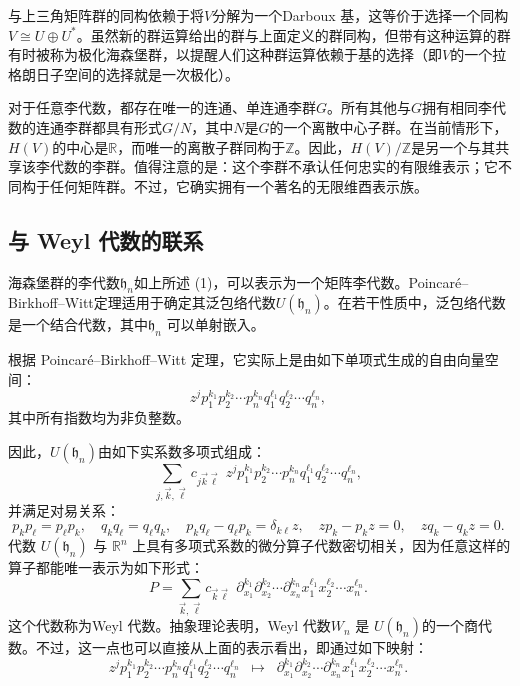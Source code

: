与上三角矩阵群的同构依赖于将$V$分解为一个Darboux 基，这等价于选择一个同构$V \cong U \oplus U^{*}$。虽然新的群运算给出的群与上面定义的群同构，但带有这种运算的群有时被称为极化海森堡群，以提醒人们这种群运算依赖于基的选择（即$V$的一个拉格朗日子空间的选择就是一次极化）。

对于任意李代数，都存在唯一的连通、单连通李群$G$。所有其他与$G$拥有相同李代数的连通李群都具有形式$G/N$，其中$N$是$G$的一个离散中心子群。在当前情形下，$H(V)$的中心是$\mathbb{R}$，而唯一的离散子群同构于$\mathbb{Z}$。因此，$H(V)/\mathbb{Z}$是另一个与其共享该李代数的李群。值得注意的是：这个李群不承认任何忠实的有限维表示；它不同构于任何矩阵群。不过，它确实拥有一个著名的无限维酉表示族。
\subsection{与 Weyl 代数的联系}
海森堡群的李代数$\mathfrak{h}_{n}$如上所述 (1)，可以表示为一个矩阵李代数。Poincaré–Birkhoff–Witt定理适用于确定其泛包络代数$U(\mathfrak{h}_{n})$。在若干性质中，泛包络代数是一个结合代数，其中$\mathfrak{h}_{n}$ 可以单射嵌入。

根据 Poincaré–Birkhoff–Witt 定理，它实际上是由如下单项式生成的自由向量空间：
$$
z^{j} p_{1}^{k_{1}} p_{2}^{k_{2}} \cdots p_{n}^{k_{n}} q_{1}^{\ell_{1}} q_{2}^{\ell_{2}} \cdots q_{n}^{\ell_{n}},~
$$
其中所有指数均为非负整数。

因此，$U(\mathfrak{h}_{n})$由如下实系数多项式组成：
$$
\sum_{j, \vec{k}, \vec{\ell}} c_{j \vec{k} \vec{\ell}} \,\, z^{j} p_{1}^{k_{1}} p_{2}^{k_{2}} \cdots p_{n}^{k_{n}} q_{1}^{\ell_{1}} q_{2}^{\ell_{2}} \cdots q_{n}^{\ell_{n}},~
$$
并满足对易关系：
$$
p_{k} p_{\ell} = p_{\ell} p_{k}, \quad 
q_{k} q_{\ell} = q_{\ell} q_{k}, \quad 
p_{k} q_{\ell} - q_{\ell} p_{k} = \delta_{k\ell} z, \quad 
zp_{k} - p_{k}z = 0, \quad 
zq_{k} - q_{k}z = 0.~
$$
代数 $U(\mathfrak{h}_{n})$ 与 $\mathbb{R}^{n}$ 上具有多项式系数的微分算子代数密切相关，因为任意这样的算子都能唯一表示为如下形式：
$$
P = \sum_{\vec{k}, \vec{\ell}} c_{\vec{k} \vec{\ell}} \,\, 
\partial_{x_{1}}^{k_{1}} \partial_{x_{2}}^{k_{2}} \cdots \partial_{x_{n}}^{k_{n}} 
x_{1}^{\ell_{1}} x_{2}^{\ell_{2}} \cdots x_{n}^{\ell_{n}}.~
$$
这个代数称为Weyl 代数。抽象理论表明，Weyl 代数$W_{n}$ 是 $U(\mathfrak{h}_{n})$的一个商代数。不过，这一点也可以直接从上面的表示看出，即通过如下映射：
$$
z^{j} p_{1}^{k_{1}} p_{2}^{k_{2}} \cdots p_{n}^{k_{n}} q_{1}^{\ell_{1}} q_{2}^{\ell_{2}} \cdots q_{n}^{\ell_{n}}
\;\;\mapsto\;\;
\partial_{x_{1}}^{k_{1}} \partial_{x_{2}}^{k_{2}} \cdots \partial_{x_{n}}^{k_{n}}
x_{1}^{\ell_{1}} x_{2}^{\ell_{2}} \cdots x_{n}^{\ell_{n}}.~
$$
